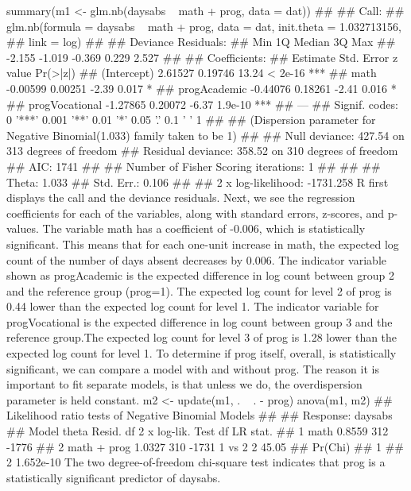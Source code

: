 \documentclass[00-GLMregression.tex]{subfiles}
\begin{document}
summary(m1 <- glm.nb(daysabs ~ math + prog, data = dat))
## 
## Call:
## glm.nb(formula = daysabs ~ math + prog, data = dat, init.theta = 1.032713156, 
##     link = log)
## 
## Deviance Residuals: 
##    Min      1Q  Median      3Q     Max  
## -2.155  -1.019  -0.369   0.229   2.527  
## 
## Coefficients:
##                Estimate Std. Error z value Pr(>|z|)    
## (Intercept)     2.61527    0.19746   13.24  < 2e-16 ***
## math           -0.00599    0.00251   -2.39    0.017 *  
## progAcademic   -0.44076    0.18261   -2.41    0.016 *  
## progVocational -1.27865    0.20072   -6.37  1.9e-10 ***
## ---
## Signif. codes:  0 '***' 0.001 '**' 0.01 '*' 0.05 '.' 0.1 ' ' 1
## 
## (Dispersion parameter for Negative Binomial(1.033) family taken to be 1)
## 
##     Null deviance: 427.54  on 313  degrees of freedom
## Residual deviance: 358.52  on 310  degrees of freedom
## AIC: 1741
## 
## Number of Fisher Scoring iterations: 1
## 
## 
##               Theta:  1.033 
##           Std. Err.:  0.106 
## 
##  2 x log-likelihood:  -1731.258
R first displays the call and the deviance residuals. Next, we see the regression coefficients for each of the variables, along with standard errors, z-scores, and p-values. The variable math has a coefficient of -0.006, which is statistically significant. This means that for each one-unit increase in math, the expected log count of the number of days absent decreases by 0.006. The indicator variable shown as progAcademic is the expected difference in log count between group 2 and the reference group (prog=1). The expected log count for level 2 of prog is 0.44 lower than the expected log count for level 1. The indicator variable for progVocational is the expected difference in log count between group 3 and the reference group.The expected log count for level 3 of prog is 1.28 lower than the expected log count for level 1. To determine if prog itself, overall, is statistically significant, we can compare a model with and without prog. The reason it is important to fit separate models, is that unless we do, the overdispersion parameter is held constant.
m2 <- update(m1, . ~ . - prog)
anova(m1, m2)
## Likelihood ratio tests of Negative Binomial Models
## 
## Response: daysabs
##         Model  theta Resid. df    2 x log-lik.   Test    df LR stat.
## 1        math 0.8559       312           -1776                      
## 2 math + prog 1.0327       310           -1731 1 vs 2     2    45.05
##     Pr(Chi)
## 1          
## 2 1.652e-10
The two degree-of-freedom chi-square test indicates that prog is a statistically significant predictor of daysabs.
\end{document}
